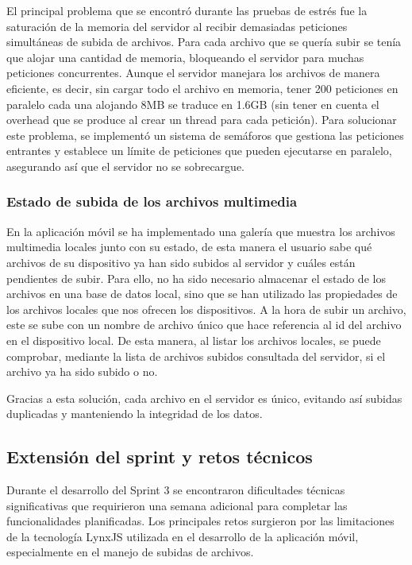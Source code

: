El principal problema que se encontró durante las pruebas de estrés fue la saturación de la memoria del servidor al recibir demasiadas peticiones simultáneas de subida de archivos. Para cada archivo que se quería subir se tenía que alojar una cantidad de memoria, bloqueando el servidor para muchas peticiones concurrentes. Aunque el servidor manejara los archivos de manera eficiente, es decir, sin cargar todo el archivo en memoria, tener 200 peticiones en paralelo cada una alojando 8MB se traduce en 1.6GB (sin tener en cuenta el overhead que se produce al crear un thread para cada petición). Para solucionar este problema, se implementó un sistema de semáforos que gestiona las peticiones entrantes y establece un límite de peticiones que pueden ejecutarse en paralelo, asegurando así que el servidor no se sobrecargue.

\subsubsection{Estado de subida de los archivos multimedia}
En la aplicación móvil se ha implementado una galería que muestra los archivos multimedia locales junto con su estado, de esta manera el usuario sabe qué archivos de su dispositivo ya han sido subidos al servidor y cuáles están pendientes de subir.
Para ello, no ha sido necesario almacenar el estado de los archivos en una base de datos local, sino que se han utilizado las propiedades de los archivos locales que nos ofrecen los dispositivos. A la hora de subir un archivo, este se sube con un nombre de archivo único que hace referencia al id del archivo en el dispositivo local. De esta manera, al listar los archivos locales, se puede comprobar, mediante la lista de archivos subidos consultada del servidor, si el archivo ya ha sido subido o no.

Gracias a esta solución, cada archivo en el servidor es único, evitando así subidas duplicadas y manteniendo la integridad de los datos.

\subsection{Extensión del sprint y retos técnicos}

Durante el desarrollo del Sprint 3 se encontraron dificultades técnicas significativas que requirieron una semana adicional para completar las funcionalidades planificadas. Los principales retos surgieron por las limitaciones de la tecnología LynxJS utilizada en el desarrollo de la aplicación móvil, especialmente en el manejo de subidas de archivos.

